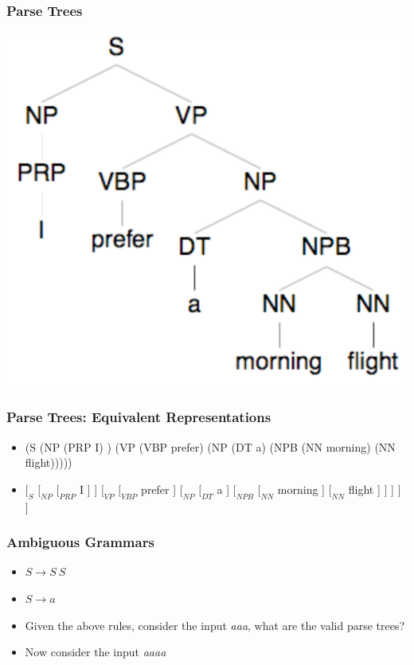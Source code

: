 \begin{frame}
\frametitle{Parse Trees}

\includegraphics[scale=.5]{figures/cfg2}

\end{frame}

\begin{frame}
\frametitle{Parse Trees: Equivalent Representations}
\begin{itemize}
\item (S (NP (PRP I) ) (VP (VBP prefer) (NP (DT a) (NPB (NN morning) (NN flight)))))
\item $[_{S}$ $[_{NP}$ $[_{PRP}$ I ] ] $[_{VP}$ $[_{VBP}$ prefer ]
$[_{NP}$ $[_{DT}$ a ] $[_{NPB}$ $[_{NN}$ morning ] $[_{NN}$ flight ] ] ] ] ]
\end{itemize}

\end{frame}

\begin{frame}
\frametitle{Ambiguous Grammars}
\begin{itemize}
\item $S \rightarrow S\ S$
\item $S \rightarrow a$
\item Given the above rules, consider the input {\em aaa}, what are the valid parse trees?
\item Now consider the input {\em aaaa}
\end{itemize}

\end{frame}

